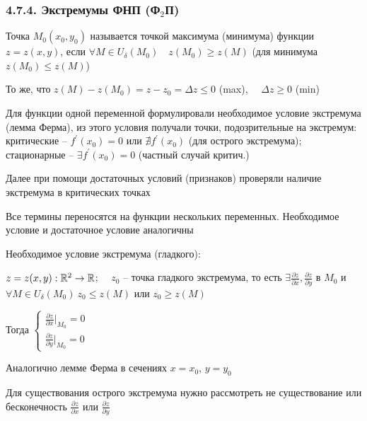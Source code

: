 \documentclass[12pt]{article}
\begin{document}
    \subsubsection{4.7.4. Экстремумы ФНП (Ф$_2$П)}

    \hypertarget{extremumsoffunctions}{}

    \Def Точка $M_0(x_0, y_0)$ называется точкой максимума (минимума) функции $z = z(x, y)$, если $\forall M \in U_\delta (M_0) \quad z(M_0) \geq z(M)$ (для минимума $z(M_0) \leq z(M)$)

    \Nota То же, что $z(M) - z(M_0) = z - z_0 = \Delta z \leq 0$ (max), $\quad \Delta z \geq 0$ (min)

    \Mem Для функции одной переменной формулировали необходимое условие экстремума (лемма Ферма), из этого условия получали точки, подозрительные на экстремум: критические -- $f^\prime(x_0) = 0$ или $\nexists f^\prime(x_0)$ (для острого экстремума); стационарные -- $\exists f^\prime(x_0) = 0$ (частный случай критич.)

    Далее при помощи достаточных условий (признаков) проверяли наличие экстремума в критических точках

    \Nota Все термины переносятся на функции нескольких переменных. 
    Необходимое условие и достаточное условие аналогичны

    \hypertarget{extremumnecessarycondition}{}

    \begin{MyTheorem}
        \Ths Необходимое условие экстремума (гладкого):

        $z = z(x, y) : \mathbb{R}^2 \rightarrow \mathbb{R}$; $\quad z_0$ -- точка гладкого экстремума,
        то есть $\exists \frac{\partial z}{\partial x}, \frac{\partial z}{\partial y}$ в $M_0$ и $\forall M \in U_\delta(M_0) \ z_0 \leq z(M)$ или $z_0 \geq z(M)$

        Тогда $\begin{cases}\frac{\partial z}{\partial x} \Big|_{M_0} = 0 \\ \frac{\partial z}{\partial y} \Big|_{M_0} = 0\end{cases}$
    \end{MyTheorem}

    \begin{MyProof}
        Аналогично лемме Ферма в сечениях $x = x_0$, $y = y_0$
    \end{MyProof}
    
    Для существования острого экстремума нужно рассмотреть не существование или бесконечность $\frac{\partial z}{\partial x}$ или $\frac{\partial z}{\partial y}$
\end{document}
